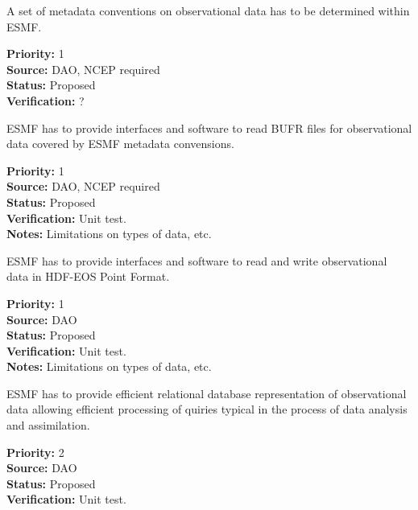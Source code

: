 A set of metadata conventions on observational data has to be determined
within ESMF.


\begin{reqlist}
{\bf Priority:} 1 \\
{\bf Source:} DAO, NCEP required \\
{\bf Status:} Proposed \\
{\bf Verification:} ? \\
\end{reqlist}




ESMF has to provide interfaces and software to read BUFR files for
observational data covered by ESMF metadata convensions.

\begin{reqlist}
{\bf Priority:} 1 \\
{\bf Source:} DAO, NCEP required \\
{\bf Status:} Proposed \\
{\bf Verification:} Unit test. \\
{\bf Notes:} Limitations on types of data, etc.
\end{reqlist}


ESMF has to provide interfaces and software to read and write
observational data in HDF-EOS Point Format.

\begin{reqlist}
{\bf Priority:} 1 \\
{\bf Source:} DAO \\
{\bf Status:} Proposed \\
{\bf Verification:} Unit test. \\
{\bf Notes:} Limitations on types of data, etc.
\end{reqlist}


ESMF has to provide efficient relational database representation of
observational data allowing efficient processing of quiries typical in
the process of data analysis and assimilation.

\begin{reqlist}
{\bf Priority:} 2 \\
{\bf Source:} DAO \\
{\bf Status:} Proposed \\
{\bf Verification:} Unit test.
\end{reqlist}

